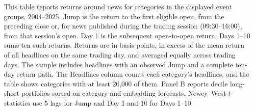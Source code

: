 \begin{table}[htbp]
\centering
\caption{Returns around News by Event Category}
\label{tab:tabA_drift}
\begin{minipage}{\linewidth}\footnotesize
This table reports returns around news for categories in the displayed event groups, 2004--2025. Jump is the return to the first eligible open, from the preceding close or, for news published during the trading session (09:30--16:00), from that session's open. Day 1 is the subsequent open-to-open return; Days 1--10 sums ten such returns. Returns are in basis points, in excess of the mean return of all headlines on the same trading day, and averaged equally across trading days. The sample includes headlines with an observed Jump and a complete ten-day return path. The Headlines column counts each category's headlines, and the table shows categories with at least 20,000 of them. Panel B reports decile long-short portfolios sorted on category and embedding forecasts. Newey--West $t$-statistics use 5 lags for Jump and Day 1 and 10 for Days 1--10.
\end{minipage}
\medskip


\end{table}
